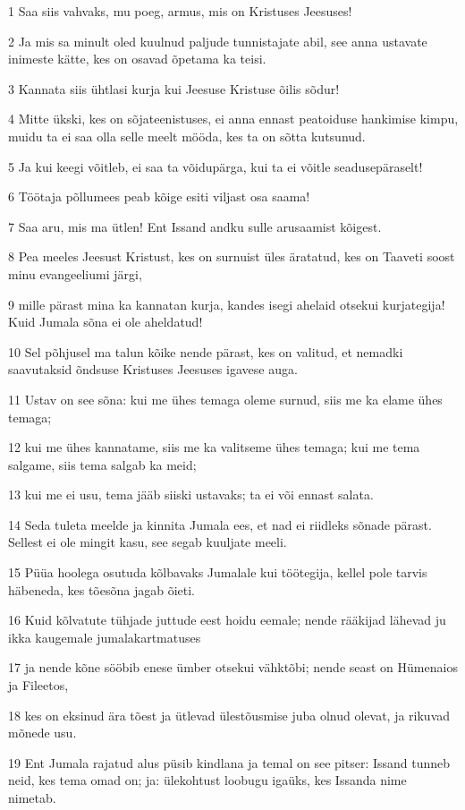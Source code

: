 \par 1 Saa siis vahvaks, mu poeg, armus, mis on Kristuses Jeesuses!
\par 2 Ja mis sa minult oled kuulnud paljude tunnistajate abil, see anna ustavate inimeste kätte, kes on osavad õpetama ka teisi.
\par 3 Kannata siis ühtlasi kurja kui Jeesuse Kristuse õilis sõdur!
\par 4 Mitte ükski, kes on sõjateenistuses, ei anna ennast peatoiduse hankimise kimpu, muidu ta ei saa olla selle meelt mööda, kes ta on sõtta kutsunud.
\par 5 Ja kui keegi võitleb, ei saa ta võidupärga, kui ta ei võitle seadusepäraselt!
\par 6 Töötaja põllumees peab kõige esiti viljast osa saama!
\par 7 Saa aru, mis ma ütlen! Ent Issand andku sulle arusaamist kõigest.
\par 8 Pea meeles Jeesust Kristust, kes on surnuist üles äratatud, kes on Taaveti soost minu evangeeliumi järgi,
\par 9 mille pärast mina ka kannatan kurja, kandes isegi ahelaid otsekui kurjategija! Kuid Jumala sõna ei ole aheldatud!
\par 10 Sel põhjusel ma talun kõike nende pärast, kes on valitud, et nemadki saavutaksid õndsuse Kristuses Jeesuses igavese auga.
\par 11 Ustav on see sõna: kui me ühes temaga oleme surnud, siis me ka elame ühes temaga;
\par 12 kui me ühes kannatame, siis me ka valitseme ühes temaga; kui me tema salgame, siis tema salgab ka meid;
\par 13 kui me ei usu, tema jääb siiski ustavaks; ta ei või ennast salata.
\par 14 Seda tuleta meelde ja kinnita Jumala ees, et nad ei riidleks sõnade pärast. Sellest ei ole mingit kasu, see segab kuuljate meeli.
\par 15 Püüa hoolega osutuda kõlbavaks Jumalale kui töötegija, kellel pole tarvis häbeneda, kes tõesõna jagab õieti.
\par 16 Kuid kõlvatute tühjade juttude eest hoidu eemale; nende rääkijad lähevad ju ikka kaugemale jumalakartmatuses
\par 17 ja nende kõne sööbib enese ümber otsekui vähktõbi; nende seast on Hümenaios ja Fileetos,
\par 18 kes on eksinud ära tõest ja ütlevad ülestõusmise juba olnud olevat, ja rikuvad mõnede usu.
\par 19 Ent Jumala rajatud alus püsib kindlana ja temal on see pitser: Issand tunneb neid, kes tema omad on; ja: ülekohtust loobugu igaüks, kes Issanda nime nimetab.
